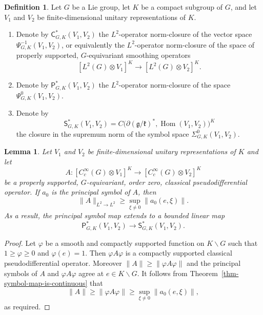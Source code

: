 \documentclass[leqno,11pt]{amsart}
\numberwithin{equation}{subsection}
\theoremstyle{plain}
\newtheorem{lemma}[equation]{Lemma}
\theoremstyle{definition}
\newtheorem{definition}[equation]{Definition}
\theoremstyle{remark}
\newcommand{\PSDO}{\mathsf{P}}
\newcommand{\CC}{\mathsf{C}}
\newcommand{\Symb}{\mathsf{S}}
\DeclareMathOperator{\Hom}{Hom}
\begin{document}
\begin{definition} 
\label{def-three-c-star-categories}
Let $G$ be a  Lie  group, let $K$ be a  compact subgroup of $G$, and let $V_1$ and $V_2$ be finite-dimensional unitary representations of $K$.
\begin{enumerate}[\rm (i)]

\item Denote by  $\CC^*_{G,K}(V_1,V_2)$    the $L^2$-operator norm-closure of the vector space  $\Psi^{-1}_{G,K}(V_1,V_2)$, or equivalently the $L^2$-operator norm-closure of the space of properly supported, $G$-equivariant smoothing operators 
\[
[L^2 (G)\otimes V_1]^K\longrightarrow 
[L^2 (G)\otimes V_2]^K.
\]

\item Denote by   $\PSDO^*_{G,K}(V_1,V_2)$  the $L^2$-operator norm-closure of the space $\Psi^{0}_{G,K}(V_1,V_2)$.


\item Denote by 
\[
\Symb^*_{G,K} (V_1,V_2) = C\bigl (\partial (\mathfrak{g}/\mathfrak{k})^*, \Hom (V_1,V_2)\bigr )^K
\]
the closure in the supremum norm of the symbol space $\Sigma^0_{G,K} (V_1,V_2)$.  
\end{enumerate}
\end{definition} 




\begin{lemma} 
Let $V_1$ and $V_2$ be finite-dimensional unitary representations of $K$ and let 
\[
A \colon [C_c^\infty ( G)\otimes V_1]^K  \longrightarrow 
[C_c^\infty ( G)\otimes V_2]^K 
\]
be a properly supported, $G$-equivariant, order zero, classical pseudodifferential operator. If $a_0$ is the principal symbol of $A$, then 
\[
\| A \|_{L^2\to L^2} \ge \sup_{\xi \ne 0} \bigl \| a_0 (e,\xi)\bigr \|.
\]
As a result, the principal symbol map extends to a bounded linear map 
\[
\PSDO^*_{G,K}( V_1,V_2) \longrightarrow \Symb^*_{G,K}( V_1,V_2).
\]
\end{lemma} 

\begin{proof} 
Let $\varphi$ be a smooth and compactly supported function on $K \backslash G$ such that $1 \ge \varphi\ge 0$ and $\varphi(e) =1$.  Then $\varphi A \varphi$ is a compactly supported classical pseudodifferential operator. Moreover 
$ \| A\|\ge \| \varphi A \varphi \| $ and the principal symbols of $A$ and $\varphi A \varphi$ agree at $e\in K\backslash G$. It follows from Theorem~\ref{thm-symbol-map-is-continuous} that 
\[
\| A\| \ge \| \varphi A \varphi \| \ge \sup_{\xi \ne 0} \bigl \| a_0 (e,\xi)\bigr \| ,
\]
as required.
\end{proof} 
\end{document}

